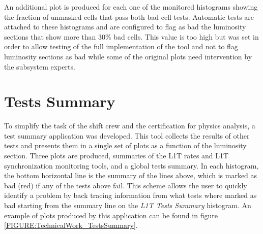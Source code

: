 An additional plot is produced for each one of the monitored histograms showing the fraction of unmasked cells that pass both bad cell tests. Automatic tests are attached to these histograms and are configured to flag as bad the luminosity sections that show more than 30\% bad cells. This value is too high but was set in order to allow testing of the full implementation of the tool and not to flag luminosity sections as bad while some of the original plots need intervention by the subsystem experts.

\section{Tests Summary}


To simplify the task of the shift crew and the certification for physics analysis, a test summary application was developed. This tool collects the results of other tests and presents them in a single set of plots as a function of the luminosity section. Three plots are produced, summaries of the \gls{L1T} rates and \gls{L1T} synchronization monitoring tools, and a global tests summary. In each histogram, the bottom horizontal line is the summary of the lines above, which is marked as bad (red) if any of the tests above fail. This scheme allows the user to quickly identify a problem by back tracing information from what tests where marked as bad starting from the summary line on the \textit{L1T Tests Summary} histogram. An example of plots produced by this application can be found in figure \ref{FIGURE:TechnicalWork_TestsSummary}.

